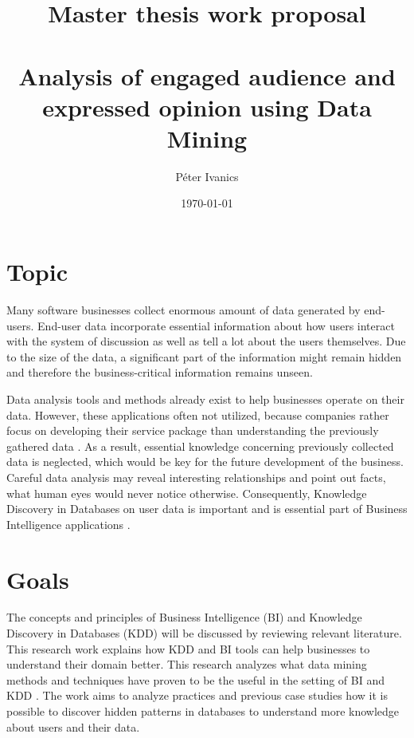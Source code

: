 \documentclass[english]{../tktltiki}
\begin{document}
\onehalfspacing

\title{Master thesis work proposal \\ \\
Analysis of engaged audience and expressed opinion using Data Mining}
\author{P\'eter Ivanics}

\date{\today}

\maketitle

%
%
%

\section{Topic}
	Many software businesses collect enormous amount of data generated by end-users. End-user data incorporate essential information about how users interact with the system of discussion as well as tell a lot about the users themselves. Due to the size of the data, a significant part of the information might remain hidden and therefore the business-critical information remains unseen. 
	
	Data analysis tools and methods already exist to help businesses operate on their data. However, these applications often not utilized, because companies rather focus on developing their service package than understanding the previously gathered data \cite{inmon2007tapping}. As a result, essential knowledge concerning previously collected data is neglected, which would be key for the future development of the business. Careful data analysis may reveal interesting relationships and point out facts, what human eyes would never notice otherwise. Consequently, Knowledge Discovery in Databases on user data is important and is essential part of Business Intelligence applications \cite{zarsky2002mine}. 

\section{Goals}
	The concepts and principles of Business Intelligence (BI) and Knowledge Discovery in Databases (KDD) will be discussed by reviewing relevant literature. This research work explains how KDD and BI tools can help businesses to understand their domain better. This research analyzes what data mining methods and techniques have proven to be the useful in the setting of BI and KDD \cite{bose2001business}. The work aims to analyze practices and previous case studies how it is possible to discover hidden patterns in databases to understand more knowledge about users and their data. 
	
\end{document}
